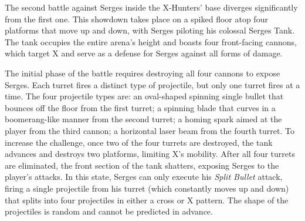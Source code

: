 The second battle against Serges inside the X-Hunters' base diverges significantly from the first one. This showdown takes place on a spiked floor atop four platforms that move up and down, with Serges piloting his colossal Serges Tank. The tank occupies the entire arena's height and boasts four front-facing cannons, which target X and serve as a defense for Serges against all forms of damage.

The initial phase of the battle requires destroying all four cannons to expose Serges. Each turret fires a distinct type of projectile, but only one turret fires at a time. The four projectile types are: an oval-shaped spinning single bullet that bounces off the floor from the first turret; a spinning blade that curves in a boomerang-like manner from the second turret; a homing spark aimed at the player from the third cannon; a horizontal laser beam from the fourth turret. To increase the challenge, once two of the four turrets are destroyed, the tank advances and destroys two platforms, limiting X's mobility. After all four turrets are eliminated, the front section of the tank shatters, exposing Serges to the player's attacks. In this state, Serges can only execute his \emph{Split Bullet} attack, firing a single projectile from his turret (which constantly moves up and down) that splits into four projectiles in either a cross or X pattern. The shape of the projectiles is random and cannot be predicted in advance.


